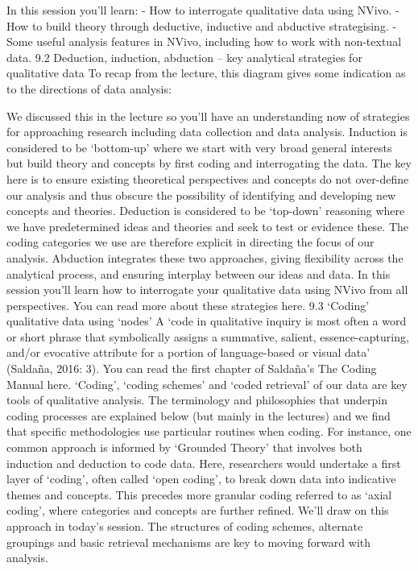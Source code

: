 \documentclass[
]{book}
\begin{document}
In this session you'll learn:
- How to interrogate qualitative data using NVivo.
- How to build theory through deductive, inductive and abductive strategising.
- Some useful analysis features in NVivo, including how to work with non-textual data.
9.2 Deduction, induction, abduction -- key analytical strategies for qualitative data
To recap from the lecture, this diagram gives some indication as to the directions of data analysis:

We discussed this in the lecture so you'll have an understanding now of strategies for approaching research including data collection and data analysis.
Induction is considered to be `bottom-up' where we start with very broad general interests but build theory and concepts by first coding and interrogating the data. The key here is to ensure existing theoretical perspectives and concepts do not over-define our analysis and thus obscure the possibility of identifying and developing new concepts and theories.
Deduction is considered to be `top-down' reasoning where we have predetermined ideas and theories and seek to test or evidence these. The coding categories we use are therefore explicit in directing the focus of our analysis.
Abduction integrates these two approaches, giving flexibility across the analytical process, and ensuring interplay between our ideas and data.
In this session you'll learn how to interrogate your qualitative data using NVivo from all perspectives. You can read more about these strategies here.
9.3 `Coding' qualitative data using `nodes'
A `code in qualitative inquiry is most often a word or short phrase that symbolically assigns a summative, salient, essence-capturing, and/or evocative attribute for a portion of language-based or visual data' (Saldaña, 2016: 3). You can read the first chapter of Saldaña's The Coding Manual here.
`Coding', `coding schemes' and `coded retrieval' of our data are key tools of qualitative analysis. The terminology and philosophies that underpin coding processes are explained below (but mainly in the lectures) and we find that specific methodologies use particular routines when coding. For instance, one common approach is informed by `Grounded Theory' that involves both induction and deduction to code data. Here, researchers would undertake a first layer of `coding', often called `open coding', to break down data into indicative themes and concepts. This precedes more granular coding referred to as `axial coding', where categories and concepts are further refined. We'll draw on this approach in today's session. The structures of coding schemes, alternate groupings and basic retrieval mechanisms are key to moving forward with analysis.
\end{document}
